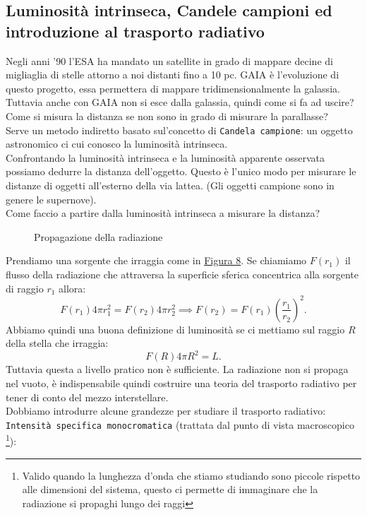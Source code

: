 \subsection{Luminosità intrinseca, Candele campioni ed introduzione al trasporto radiativo}%
Negli anni '90 l'ESA ha mandato un satellite in grado di mappare decine di migliaglia di stelle attorno a noi distanti fino a 10 pc. GAIA è l'evoluzione di questo progetto, essa permettera di mappare tridimensionalmente la galassia. \\
Tuttavia anche con GAIA non si esce dalla galassia, quindi come si fa ad uscire? Come si misura la distanza se non sono in grado di misurare la parallasse?\\
Serve un metodo indiretto basato sul'concetto di \texttt{Candela campione}: un oggetto astronomico ci cui conosco la luminosità intrinseca.\\
Confrontando la luminosità intrinseca e la luminosità apparente osservata possiamo dedurre la distanza dell'oggetto. Questo è l'unico modo per misurare le distanze di oggetti all'esterno della via lattea. (Gli oggetti campione sono in genere le supernove).\\
Come faccio a partire dalla luminosità intrinseca a misurare la distanza?
\begin{figure}[H]
    \centering
    \caption{Propagazione della radiazione}
    \label{fig:propagazione-della-radiazione}
\end{figure}
\noindent
Prendiamo una sorgente che irraggia come in \hyperref[fig:propagazione-della-radiazione]{Figura 8}. 
Se chiamiamo $F\left( r_1 \right) $ il flusso della radiazione che attraversa la superficie sferica concentrica alla sorgente di raggio $r_1$ allora:
\[
	F\left( r_1 \right) 4\pi r_1^2 = F\left( r_2 \right) 4\pi r_2^2 \implies F\left( r_2 \right) = F\left( r_1 \right) \left( \frac{r_1}{r_2} \right) ^2
.\] 
Abbiamo quindi una buona definizione di luminosità se ci mettiamo sul raggio $R$ della stella che irraggia:
\[
	F\left( R \right) 4\pi R^2  = L
.\] 
Tuttavia questa a livello pratico non è sufficiente. La radiazione non si propaga nel vuoto, è indispensabile quindi costruire una teoria del trasporto radiativo per tener di conto del mezzo interstellare. \\
Dobbiamo introdurre alcune grandezze per studiare il trasporto radiativo: \texttt{Intensità specifica monocromatica} (trattata dal punto di vista macroscopico \footnote{Valido quando la lunghezza d'onda che stiamo studiando sono piccole rispetto alle dimensioni del sistema, questo ci permette di immaginare che la radiazione si propaghi lungo dei raggi}):
